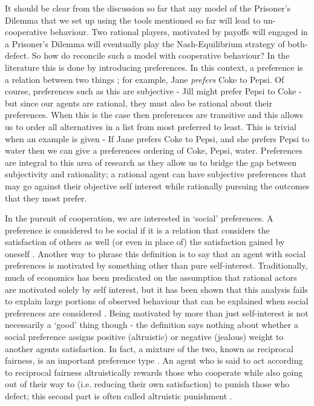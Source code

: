 \documentclass[11pt]{article}
\newcommand*{\np}{\par\noindent\newline}
\begin{document}
\np It should be clear from the discussion so far that any model of the Prisoner's Dilemma that we set up using 
the tools mentioned so far will lead to un-cooperative behaviour. Two rational players, motivated by payoffs will
engaged in a Prisoner's Dilemma will eventually play the Nash-Equilibrium strategy of both-defect. So how do reconcile
such a model with cooperative behaviour? In the literature this is done by introducing preferences. In this context, a
preference is a relation between two things \citep{angner_course_2012}; for example, Jane \textit{prefers} Coke to
Pepsi. Of course, preferences such as this are subjective - Jill might prefer Pepsi to Coke - but since our agents are
rational, they must also be rational about their preferences. When this is the case then preferences are transitive and
this allows us to order all alternatives in a list from most preferred to least. This is trivial when an example is
given - If Jane prefers Coke to Pepsi, and she prefers Pepsi to water then we can give a preferences ordering of Coke,
Pepsi, water.
Preferences are integral to this area of research as they allow us to bridge the gap between subjectivity and
rationality; a rational agent can have subjective preferences that may go against their objective self interest while
rationally pursuing the outcomes that they most prefer.

\np In the pursuit of cooperation, we are interested in `social' preferences. A preference is considered to be social if
it is a relation that considers the satisfaction of others as well (or even in place of) the satisfaction gained by
oneself \citep{angner_course_2012}. Another way to phrase this definition is to say that an agent with social preferences
is motivated by something other than pure self-interest. Traditionally, much of economics has been predicated on the
assumption that rational actors are motivated solely by self interest, but it has been shown that this analysis fails to
explain large portions of observed behaviour that can be explained when social preferences are considered
\citep{fehr_why_2002}. Being motivated by more than just self-interest is not necessarily a `good' thing though - the
definition says nothing about whether a social preference assigns positive (altruistic) or negative (jealous) weight to
another agents satisfaction. In fact, a mixture of the two, known as reciprocal fairness, is an important preference
type \citep{fehr_why_2002,guth_evolutionary_1995}. An agent who is said to act according to reciprocal fairness
altruistically rewards those who cooperate while also going out of their way to (i.e. reducing their own satisfaction)
to punish those who defect; this second part is often called altruistic punishment \citep{fehr_altruistic_2002}.
\end{document}
